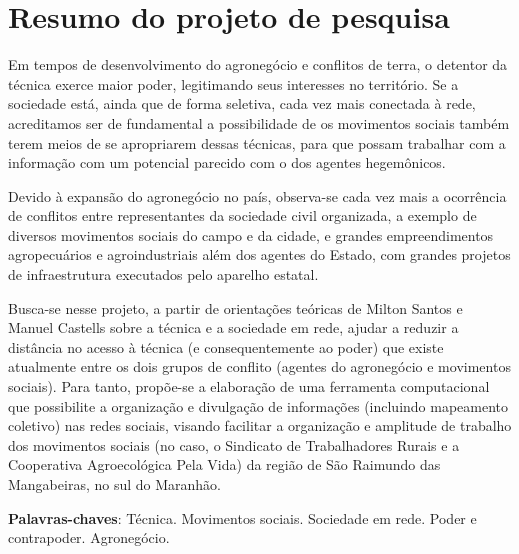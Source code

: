 
\section{Resumo do projeto de pesquisa}

Em tempos de desenvolvimento do agronegócio e conflitos de terra, o detentor da técnica exerce maior poder, legitimando seus interesses no território. Se a sociedade está, ainda que de forma seletiva, cada vez mais conectada à rede, acreditamos ser de fundamental a possibilidade de os movimentos sociais também terem meios de se apropriarem dessas técnicas, para que possam trabalhar com a informação com um potencial parecido com o dos agentes hegemônicos.

Devido à expansão do agronegócio no país, observa-se cada vez mais a ocorrência de  conflitos entre representantes da sociedade civil organizada, a exemplo de diversos movimentos sociais do campo e da cidade, e grandes empreendimentos agropecuários e agroindustriais além dos agentes do Estado, com  grandes projetos de infraestrutura executados pelo aparelho estatal.

Busca-se nesse projeto, a partir de orientações teóricas de Milton Santos e Manuel Castells sobre a técnica e a sociedade em rede, ajudar a reduzir a distância no acesso à técnica (e consequentemente ao poder) que existe atualmente entre os dois grupos de conflito (agentes do agronegócio e movimentos sociais). Para tanto, propõe-se a elaboração de uma ferramenta computacional que possibilite a organização e divulgação de informações (incluindo mapeamento coletivo) nas redes sociais, visando facilitar a organização e amplitude de trabalho dos movimentos sociais (no caso, o Sindicato de Trabalhadores Rurais e a Cooperativa Agroecológica Pela Vida) da região de São Raimundo das Mangabeiras, no sul do Maranhão.

 \textbf{Palavras-chaves}: Técnica. Movimentos sociais. Sociedade em rede. Poder e contrapoder. Agronegócio.



